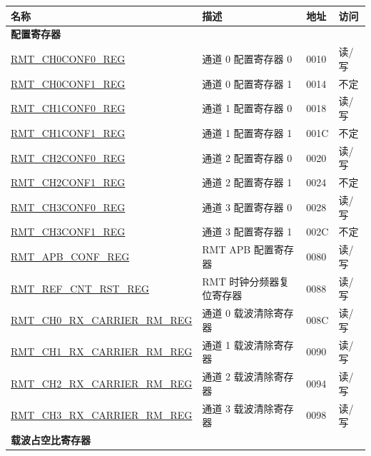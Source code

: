 ﻿\begin{longtable}{ | p{6cm} | p{6cm} | p{2cm} | p{1cm} | }
\hline\rowcolor{lightgray}
名称 & 描述 & 地址 & 访问 \\ \hline
\endhead
\multicolumn{4}{|l|}{\textbf{配置寄存器}} \\ \hline
\hyperref[regdesc:RMTCHNCONF0REG]{RMT\_CH0CONF0\_REG} & 通道 0 配置寄存器 0 & \hexprefix{}0010 & 读/写 \\ \hline
\hyperref[regdesc:RMTCHNCONF1REG]{RMT\_CH0CONF1\_REG} & 通道 0 配置寄存器 1 & \hexprefix{}0014 & 不定 \\ \hline
\hyperref[regdesc:RMTCHNCONF0REG]{RMT\_CH1CONF0\_REG} & 通道 1 配置寄存器 0 & \hexprefix{}0018 & 读/写 \\ \hline
\hyperref[regdesc:RMTCHNCONF1REG]{RMT\_CH1CONF1\_REG} & 通道 1 配置寄存器 1 & \hexprefix{}001C & 不定 \\ \hline
\hyperref[regdesc:RMTCHNCONF0REG]{RMT\_CH2CONF0\_REG} & 通道 2 配置寄存器 0 & \hexprefix{}0020 & 读/写 \\ \hline
\hyperref[regdesc:RMTCHNCONF1REG]{RMT\_CH2CONF1\_REG} & 通道 2 配置寄存器 1 & \hexprefix{}0024 & 不定 \\ \hline
\hyperref[regdesc:RMTCHNCONF0REG]{RMT\_CH3CONF0\_REG} & 通道 3 配置寄存器 0 & \hexprefix{}0028 & 读/写 \\ \hline
\hyperref[regdesc:RMTCHNCONF1REG]{RMT\_CH3CONF1\_REG} & 通道 3 配置寄存器 1 & \hexprefix{}002C & 不定 \\ \hline
\hyperref[regdesc:RMTAPBCONFREG]{RMT\_APB\_CONF\_REG} & RMT APB 配置寄存器 & \hexprefix{}0080 & 读/写 \\ \hline
\hyperref[regdesc:RMTREFCNTRSTREG]{RMT\_REF\_CNT\_RST\_REG} & RMT 时钟分频器复位寄存器 & \hexprefix{}0088 & 读/写 \\ \hline
\hyperref[regdesc:RMTCHNRXCARRIERRMREG]{RMT\_CH0\_RX\_CARRIER\_RM\_REG} & 通道 0 载波清除寄存器 & \hexprefix{}008C & 读/写 \\ \hline
\hyperref[regdesc:RMTCHNRXCARRIERRMREG]{RMT\_CH1\_RX\_CARRIER\_RM\_REG} & 通道 1 载波清除寄存器 & \hexprefix{}0090 & 读/写 \\ \hline
\hyperref[regdesc:RMTCHNRXCARRIERRMREG]{RMT\_CH2\_RX\_CARRIER\_RM\_REG} & 通道 2 载波清除寄存器 & \hexprefix{}0094 & 读/写 \\ \hline
\hyperref[regdesc:RMTCHNRXCARRIERRMREG]{RMT\_CH3\_RX\_CARRIER\_RM\_REG} & 通道 3 载波清除寄存器 & \hexprefix{}0098 & 读/写 \\ \hline
\multicolumn{4}{|l|}{\textbf{载波占空比寄存器}} \\ \hline

\end{longtable}
